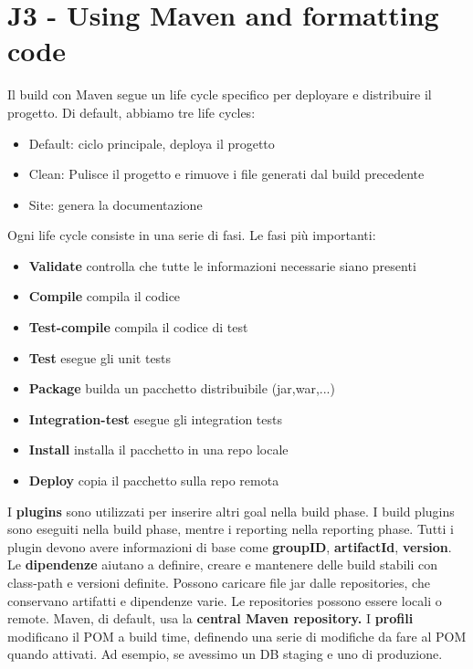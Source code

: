 \documentclass[11pt]{article}
\begin{document}
\section{J3 - Using Maven and formatting code}
Il build con Maven segue un life cycle specifico per deployare e distribuire il progetto. Di default, abbiamo tre life cycles:
\begin{itemize}
    \item Default: ciclo principale, deploya il progetto
    \item Clean: Pulisce il progetto e rimuove i file generati dal build precedente
    \item Site: genera la documentazione
\end{itemize}
Ogni life cycle consiste in una serie di fasi. 
Le fasi più importanti:
\begin{itemize}
    \item \textbf{Validate} controlla che tutte le informazioni necessarie siano presenti
    \item \textbf{Compile} compila il codice
    \item \textbf{Test-compile} compila il codice di test
    \item \textbf{Test} esegue gli unit tests
    \item \textbf{Package} builda un pacchetto distribuibile (jar,war,...)
    \item \textbf{Integration-test} esegue gli integration tests
    \item \textbf{Install} installa il pacchetto in una repo locale
    \item \textbf{Deploy} copia il pacchetto sulla repo remota
\end{itemize}
I \textbf{plugins} sono utilizzati per inserire altri goal nella build phase. I build plugins sono eseguiti nella build phase, mentre i reporting nella reporting phase. Tutti i plugin devono avere informazioni di base come \textbf{groupID}, \textbf{artifactId}, \textbf{version}.
Le \textbf{dipendenze} aiutano a definire, creare e mantenere delle build stabili con class-path e versioni definite. Possono caricare file jar dalle repositories, che conservano artifatti e dipendenze varie. Le repositories possono essere locali o remote. Maven, di default, usa la \textbf{central Maven repository.}
I \textbf{profili} modificano il POM a build time, definendo una serie di modifiche da fare al POM quando attivati. Ad esempio, se avessimo un DB staging e uno di produzione.
\end{document}

